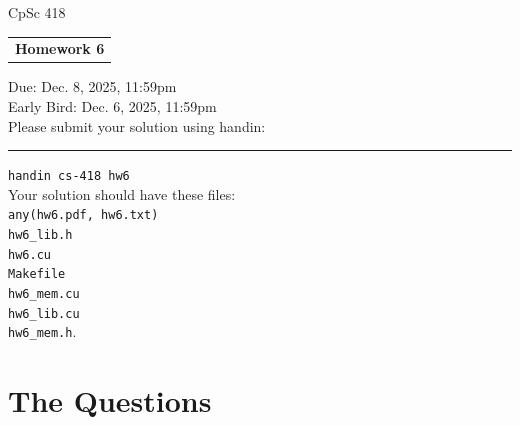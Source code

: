 \documentclass{article}
\begin{document}
\noindent%
CpSc 418 \hfill \begin{tabular}[t]{c}{\Large\bf Homework 6}\smallskip \\
\end{tabular}
\hfill Due: Dec. 8, 2025, 11:59pm\\
\hfill Early Bird: Dec. 6, 2025, 11:59pm\medskip\\
Please submit your solution using handin:\\
\rule{2em}{0ex}\texttt{handin cs-418 hw6}\\
Your solution should have these files:\\
\texttt{any(hw6.pdf, hw6.txt)\\
    hw6\_lib.h\\hw6.cu\\
    Makefile\\
    hw6\_mem.cu\\
    hw6\_lib.cu\\
    hw6\_mem.h}.

\section*{The Questions}
\end{document}
